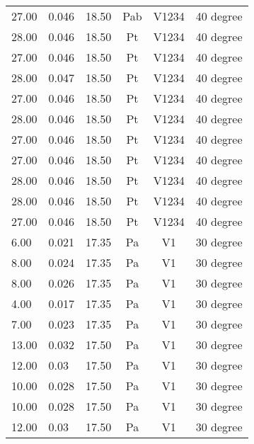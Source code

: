 \begin{table}[t]
\begin{tabular}{l | l | l | c | c | l}
27.00          & 0.046           & 18.50  & Pab      & V1234  & 40 degree           \\
28.00          & 0.046           & 18.50  & Pt       & V1234  & 40 degree           \\
27.00          & 0.046           & 18.50  & Pt       & V1234  & 40 degree           \\
28.00          & 0.047           & 18.50  & Pt       & V1234  & 40 degree           \\
27.00          & 0.046           & 18.50  & Pt       & V1234  & 40 degree           \\
28.00          & 0.046           & 18.50  & Pt       & V1234  & 40 degree           \\
27.00          & 0.046           & 18.50  & Pt       & V1234  & 40 degree           \\
27.00          & 0.046           & 18.50  & Pt       & V1234  & 40 degree           \\
28.00          & 0.046           & 18.50  & Pt       & V1234  & 40 degree           \\
28.00          & 0.046           & 18.50  & Pt       & V1234  & 40 degree           \\
27.00          & 0.046           & 18.50  & Pt       & V1234  & 40 degree           \\
6.00           & 0.021           & 17.35  & Pa       & V1     & 30 degree           \\
8.00           & 0.024           & 17.35  & Pa       & V1     & 30 degree           \\
8.00           & 0.026           & 17.35  & Pa       & V1     & 30 degree           \\
4.00           & 0.017           & 17.35  & Pa       & V1     & 30 degree           \\
7.00           & 0.023           & 17.35  & Pa       & V1     & 30 degree           \\
13.00          & 0.032           & 17.50  & Pa       & V1     & 30 degree           \\
12.00          & 0.03            & 17.50  & Pa       & V1     & 30 degree           \\
10.00          & 0.028           & 17.50  & Pa       & V1     & 30 degree           \\
10.00          & 0.028           & 17.50  & Pa       & V1     & 30 degree           \\
12.00          & 0.03            & 17.50  & Pa       & V1     & 30 degree           \\
\end{tabular}
\end{table}

